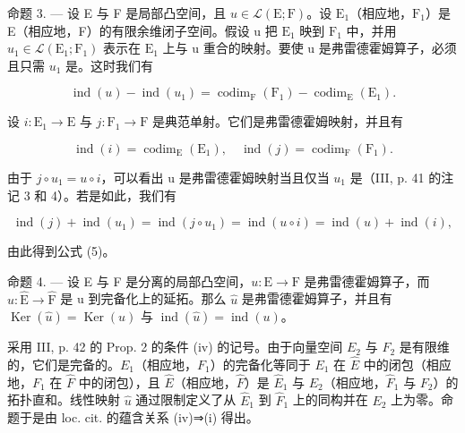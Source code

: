 命题 3. --- 设 E 与 F 是局部凸空间，且 \(u \in \mathcal{L}(\mathrm{E};\mathrm{F})\)。设 \(\mathrm{E}_{1}\)（相应地，\(\mathrm{F}_{1}\)）是 E（相应地，F）的有限余维闭子空间。假设 u 把 \(\mathrm{E}_{1}\) 映到 \(\mathrm{F}_{1}\) 中，并用 \(u_{1} \in \mathcal{L}(\mathrm{E}_{1};\mathrm{F}_{1})\) 表示在 \(\mathrm{E}_{1}\) 上与 u 重合的映射。要使 u 是弗雷德霍姆算子，必须且只需 \(u_{1}\) 是。这时我们有

\[
\operatorname{ind} (u) - \operatorname{ind} \left(u _ {1}\right) = \operatorname{codim} _ {\mathrm{F}} \left(\mathrm{F} _ {1}\right) - \operatorname{codim} _ {\mathrm{E}} \left(\mathrm{E} _ {1}\right).\tag{5}
\]

设 \(i\colon \mathrm{E}_{1}\to \mathrm{E}\) 与 \(j\colon \mathrm{F}_{1}\to \mathrm{F}\) 是典范单射。它们是弗雷德霍姆映射，并且有

\[
\operatorname{ind} (i) = \operatorname{codim} _ {\mathrm{E}} (\mathrm{E} _ {1}), \quad \operatorname{ind} (j) = \operatorname{codim} _ {\mathrm{F}} (\mathrm{F} _ {1}).
\]

由于 \(j \circ u_{1} = u \circ i\)，可以看出 u 是弗雷德霍姆映射当且仅当 \(u_{1}\) 是（III, p. 41 的注记 3 和 4）。若是如此，我们有

\[
\operatorname{ind} (j) + \operatorname{ind} (u _ {1}) = \operatorname{ind} (j \circ u _ {1}) = \operatorname{ind} (u \circ i) = \operatorname{ind} (u) + \operatorname{ind} (i),
\]

由此得到公式 (5)。

命题 4. --- 设 E 与 F 是分离的局部凸空间，\(u: \mathrm{E} \to \mathrm{F}\) 是弗雷德霍姆算子，而 \(\widehat{u}: \widehat{\mathrm{E}} \to \widehat{\mathrm{F}}\) 是 u 到完备化上的延拓。那么 \(\widehat{u}\) 是弗雷德霍姆算子，并且有 \(\operatorname{Ker}(\widehat{u}) = \operatorname{Ker}(u)\) 与 \(\operatorname{ind}(\widehat{u}) = \operatorname{ind}(u)\)。

采用 III, p. 42 的 Prop. 2 的条件 (iv) 的记号。由于向量空间 \(E_{2}\) 与 \(F_{2}\) 是有限维的，它们是完备的。\(E_{1}\)（相应地，\(F_{1}\)）的完备化等同于 \(E_{1}\) 在 \(\widehat{E}\) 中的闭包（相应地，\(F_{1}\) 在 \(\widehat{F}\) 中的闭包），且 \(\widehat{E}\)（相应地，\(\widehat{F}\)）是 \(\widehat{E}_{1}\) 与 \(E_{2}\)（相应地，\(\widehat{F}_{1}\) 与 \(F_{2}\)）的拓扑直和。线性映射 \(\widehat{u}\) 通过限制定义了从 \(\widehat{E}_{1}\) 到 \(\widehat{F}_{1}\) 上的同构并在 \(E_{2}\) 上为零。命题于是由 loc. cit. 的蕴含关系 (iv)⇒(i) 得出。

